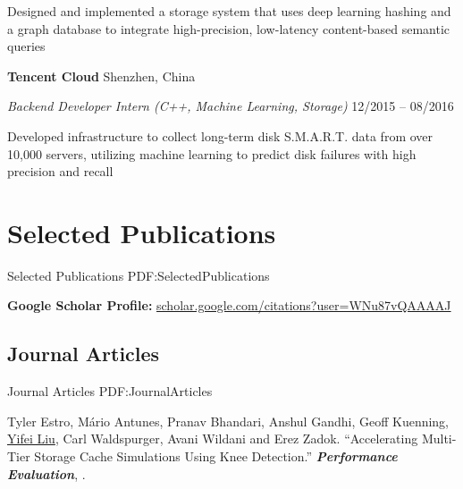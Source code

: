 \documentclass[a4paper,10pt,oneside]{article}
\begin{document}
\begin{body}
\GapNoBreak
\BulletItem
Designed and implemented a storage system that uses deep learning hashing and a graph database to integrate high-precision, low-latency content-based semantic queries 

\GapNoBreak
{\textbf{Tencent Cloud}} 
\hfill
Shenzhen, China

\emph{Backend Developer Intern (C++, Machine Learning, Storage)}
\hfill
12/2015 --
08/2016

\GapNoBreak
\BulletItem
Developed infrastructure to collect long-term disk S.M.A.R.T. data from over 10,000 servers, utilizing machine learning to predict disk failures with high precision and recall 



\section
{Selected Publications}
{Selected Publications}
{PDF:SelectedPublications}


\textbf{Google Scholar Profile:} \href{https://scholar.google.com/citations?user=WNu87vQAAAAJ}{scholar.google.com/citations?user=WNu87vQAAAAJ}

\subsection
{Journal Articles}
{Journal Articles}
{PDF:JournalArticles}

\NumberedItem{[1]}
Tyler Estro, Mário Antunes, Pranav Bhandari, Anshul Gandhi, Geoff Kuenning, \underline{Yifei Liu}, Carl Waldspurger, Avani Wildani and Erez Zadok.
``Accelerating Multi-Tier Storage Cache Simulations Using Knee Detection.'' 
\textit{\textbf{Performance Evaluation}},
.


\end{body}
\end{document}
